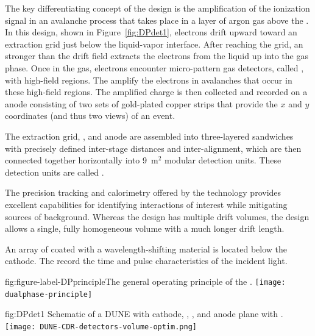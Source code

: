 The key differentiating concept of the  design is the amplification of the ionization signal in an avalanche process that takes place in a layer of argon gas above the .  
In this design, shown in Figure~\ref{fig:DPdet1}, electrons drift upward toward an extraction grid just below the liquid-vapor interface. 
After reaching the grid, an \efield stronger than the \dpnominaldriftfield{} drift field extracts the electrons from the liquid up into the gas phase. Once in the gas, electrons encounter micro-pattern gas detectors, called , with high-field regions. The  amplify the electrons in avalanches that occur in these high-field regions. The amplified charge is then collected and recorded on a \twod anode
consisting of two sets of %
gold-plated copper strips that provide the $x$ and $y$ coordinates (and thus two views) of an event. 

 The extraction grid, , and anode are assembled into three-layered sandwiches with precisely defined inter-stage distances and inter-alignment,  which are then connected together horizontally into \num{9}~m$^2$ modular detection units. These detection units are called .

The precision tracking and calorimetry offered by the  technology provides excellent capabilities for identifying interactions of interest while mitigating sources of background.  Whereas the  design has multiple drift volumes, the  design allows a single, fully homogeneous  volume with a much longer drift length.

An array of  coated with a wavelength-shifting material is located below the cathode. The  record  the time and pulse characteristics of the incident light.


\begin{dunefigure}{fig:figure-label-DPprinciple}{The general operating principle of the  .}
\texttt{[image: dualphase-principle]}
\end{dunefigure}

\begin{dunefigure}{fig:DPdet1}
  {Schematic of a \nominalmodsize DUNE    with cathode, , , and anode plane with .}
  \texttt{[image: DUNE-CDR-detectors-volume-optim.png]}
\end{dunefigure}
\FloatBarrier

